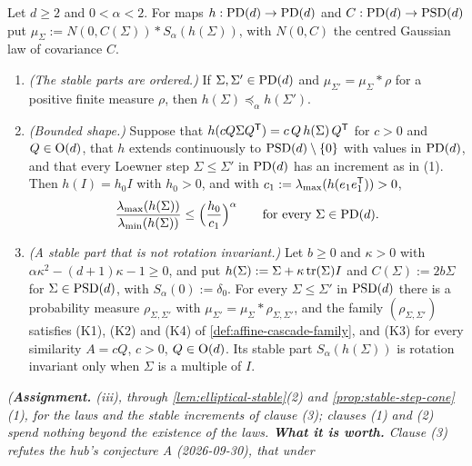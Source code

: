 \begin{proposition}
\label{prop:similarity-stable-family}
\leanok
Let $d \ge 2$ and $0 < \alpha < 2$. For maps $h : \mathrm{PD}(d) \to \mathrm{PD}(d)$ and $C : \mathrm{PD}(d) \to \mathrm{PSD}(d)$
put $\mu_\Sigma := N(0,C(\Sigma)) * S_\alpha(h(\Sigma))$, with $N(0,C)$ the centred Gaussian law of
covariance $C$.
\begin{enumerate}
\item \emph{(The stable parts are ordered.)} If $\Sigma, \Sigma' \in \mathrm{PD}(d)$ and
$\mu_{\Sigma'} = \mu_\Sigma * \rho$ for a positive finite measure $\rho$, then
$h(\Sigma) \preceq_\alpha h(\Sigma')$.
\item \emph{(Bounded shape.)} Suppose that $h(cQ\Sigma Q^{\mathsf{T}}) = c\,Q\,h(\Sigma)\,Q^{\mathsf{T}}$ for $c > 0$
and $Q \in \mathrm{O}(d)$, that $h$ extends continuously to $\mathrm{PSD}(d) \setminus \{0\}$ with values in
$\mathrm{PD}(d)$, and that every Loewner step $\Sigma \le \Sigma'$ in $\mathrm{PD}(d)$ has an increment as in (1).
Then $h(I) = h_0I$ with $h_0 > 0$, and with $c_1 := \lambda_{\max}(h(e_1e_1^{\mathsf{T}})) > 0$,
\[
  \frac{\lambda_{\max}(h(\Sigma))}{\lambda_{\min}(h(\Sigma))} \le \Bigl(\frac{h_0}{c_1}\Bigr)^{\alpha}
  \qquad \text{for every } \Sigma \in \mathrm{PD}(d) .
\]
\item \emph{(A stable part that is not rotation invariant.)} Let $b \ge 0$ and $\kappa > 0$ with
$\alpha\kappa^2 - (d+1)\kappa - 1 \ge 0$, and put $h(\Sigma) := \Sigma + \kappa\operatorname{tr}(\Sigma)I$ and
$C(\Sigma) := 2b\Sigma$ for $\Sigma \in \mathrm{PSD}(d)$, with $S_\alpha(0) := \delta_0$. For every
$\Sigma \le \Sigma'$ in $\mathrm{PSD}(d)$ there is a probability measure $\rho_{\Sigma,\Sigma'}$ with
$\mu_{\Sigma'} = \mu_\Sigma * \rho_{\Sigma,\Sigma'}$, and the family $(\rho_{\Sigma,\Sigma'})$ satisfies
(K1), (K2) and (K4) of \ref{def:affine-cascade-family}, and (K3) for every similarity $A = cQ$,
$c > 0$, $Q \in \mathrm{O}(d)$. Its stable part $S_\alpha(h(\Sigma))$ is rotation invariant only when
$\Sigma$ is a multiple of $I$.
\end{enumerate}
\statusA\quad{}\quad\emph{(\textbf{Assignment.} (iii), through
\ref{lem:elliptical-stable}(2) and \ref{prop:stable-step-cone}(1), for the laws and the stable
increments of clause (3); clauses (1) and (2) spend nothing beyond the existence of the laws.
\textbf{What it is worth.} Clause (3) refutes the hub's conjecture A (2026-09-30), that under
}
\end{proposition}
